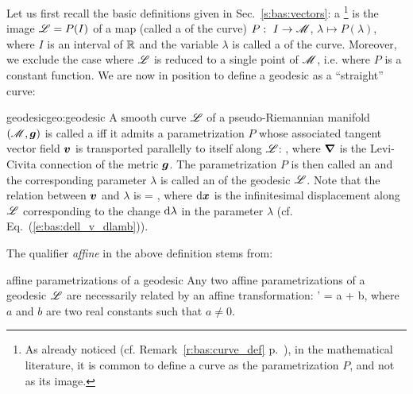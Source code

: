 Let us first recall the basic definitions given in Sec.~\ref{s:bas:vectors}:
a \footnote{As already noticed (cf. Remark~\ref{r:bas:curve_def} p.~\pageref{r:bas:curve_def}), in the mathematical literature, it is common to define
a curve as the parametrization $P$, and not as its image.}
is the image $\mathscr{L}=P(I)$
of a map (called a  of the curve)
$P:\ I\rightarrow \mathscr{M}$, $\lambda\mapsto P(\lambda)$,
where $I$ is an interval of $\mathbb{R}$ and the variable $\lambda$ is called a
 of the curve.
Moreover, we exclude the case where $\mathscr{L}$ is reduced to a single point
of $\mathscr{M}$, i.e. where $P$ is a constant function.
We are now in position to define a geodesic as a ``straight'' curve:

\begin{tdef}{geodesic}{geo:geodesic}
A smooth curve $\mathscr{L}$ of a pseudo-Riemannian manifold $(\mathscr{M},\bm{g})$ is
called a  iff it admits a parametrization $P$ whose associated
tangent vector field $\bm{v}$ is transported parallelly to itself along
$\mathscr{L}$:
\be \label{e:geo:geod_eq_v}
    ,
\ee
where $\bm{\nabla}$ is the Levi-Civita connection of the metric $\bm{g}$.
The parametrization $P$ is then called an
and the corresponding parameter $\lambda$ is called an
 of the
geodesic $\mathscr{L}$. Note that the relation between $\bm{v}$ and $\lambda$ is
\be \label{e:geo:v_dxdlambda}
     =  ,
\ee
where $\mathrm{d}\bm{x}$ is the infinitesimal displacement along $\mathscr{L}$ corresponding
to the change $\mathrm{d}\lambda$ in the parameter $\lambda$
(cf. Eq.~(\ref{e:bas:dell_v_dlamb})).
\end{tdef}

The qualifier \emph{affine} in the above definition stems from:
\begin{tprop}{affine parametrizations of a geodesic}{}
Any two affine parametrizations of a geodesic $\mathscr{L}$ are necessarily
related by an affine transformation:
\be \label{e:geo:affine_transf}
    \lambda' = a \lambda + b,
\ee
where $a$ and $b$ are two real constants such that $a\not = 0$.
\end{tprop}

